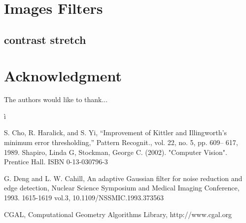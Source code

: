 \documentclass[conference]{IEEEtran}
\begin{document}
\appendices
\section{Images Filters}
\subsection{contrast stretch}

\section*{Acknowledgment}


The authors would like to thank...


\ifCLASSOPTIONcaptionsoff
  \newpage
\fi



 ì%


%
%
%
\begin{thebibliography}{1}

S. Cho, R. Haralick, and S. Yi, “Improvement of Kittler and Illingworth’s minimum error thresholding,” Pattern Recognit., vol. 22, no. 5, pp. 609– 617, 1989.
Shapiro, Linda G, Stockman, George C. (2002). "Computer Vision". Prentice Hall. ISBN 0-13-030796-3

G. Deng and L. W. Cahill, An adaptive Gaussian filter for noise reduction and edge detection, Nuclear Science Symposium and Medical Imaging Conference, 1993. 1615-1619 vol.3, 10.1109/NSSMIC.1993.373563

CGAL, Computational Geometry Algorithms Library, http://www.cgal.org
\end{thebibliography}
\end{document}
